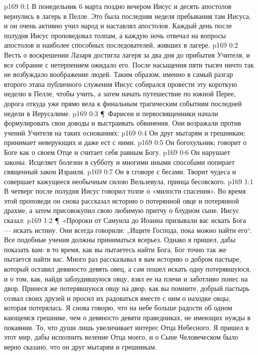 \author{Комиссия срединников}
\vs p169 0:1 В понедельник 6 марта поздно вечером Иисус и десять апостолов вернулись в лагерь в Пелле. Это была последняя неделя пребывания там Иисуса, и он очень активно учил народ и наставлял апостолов. Каждый день после полудня Иисус проповедовал толпам, а каждую ночь отвечал на вопросы апостолов и наиболее способных последователей, живших в лагере.
\vs p169 0:2 Весть о воскрешении Лазаря достигла лагеря за два дня до прибытия Учителя, и все собрание с нетерпением ожидало его. После насыщения пяти тысяч ничто так не возбуждало воображение людей. Таким образом, именно в самый разгар второго этапа публичного служения Иисус собирался провести эту короткую неделю в Пелле, чтобы учить, а затем начать путешествие по южной Перее, дорога откуда уже прямо вела к финальным трагическим событиям последней недели в Иерусалиме.
\vs p169 0:3 \P\ Фарисеи и первосвященники начали формулировать свои доводы и выстраивать обвинения. Они возражали против учений Учителя на таких основаниях:
\vs p169 0:4 \bibnobreakspace Он друг мытарям и грешникам; принимает неверующих и даже ест с ними.
\vs p169 0:5 \bibnobreakspace Он богохульник; говорит о Боге как о своем Отце и считает себя равным Богу.
\vs p169 0:6 \bibnobreakspace Он нарушает законы. Исцеляет болезни в субботу и многими иными способами попирает священный закон Израиля.
\vs p169 0:7 \bibnobreakspace Он в сговоре с бесами. Творит чудеса и совершает кажущееся необычным силою Вельзевула, принца бесовского.
\vs p169 1:1 В четверг после полудня Иисус говорил толпе о «милости спасения». Во время этой проповеди он снова рассказал историю о потерянной овце и потерянной драхме, а затем присовокупил свою любимую притчу о блудном сыне. Иисус сказал:
\vs p169 1:2 \P\ «Пророки от Самуила до Иоанна призывали вас искать Бога --- искать истину. Они всегда говорили: „Ищите Господа, пока можно найти его“. Все подобные учения должны приниматься всерьез. Однако я пришел, дабы показать вам: в то время, как вы пытаетесь найти Бога, Бог точно так же пытается найти вас. Много раз рассказывал я вам историю о добром пастыре, который оставил девяносто девять овец, а сам пошел искать одну потерявшуюся, и о том, как, найдя заблудившуюся овцу, взял ее на плечи и заботливо понес на двор. Принеся же потерявшуюся овцу на двор, как вы помните, добрый пастырь созвал своих друзей и просил их радоваться вместе с ним о находке овцы, которая потерялась. Я снова говорю, что на небе больше радости об одном кающемся грешнике, чем о девяносто девяти праведниках, не имеющих нужды в покаянии. То, что души  лишь увеличивает интерес Отца Небесного. Я пришел в этот мир, дабы исполнить веление Отца моего, и о Сыне Человеческом было верно сказано, что он друг мытарям и грешникам.
